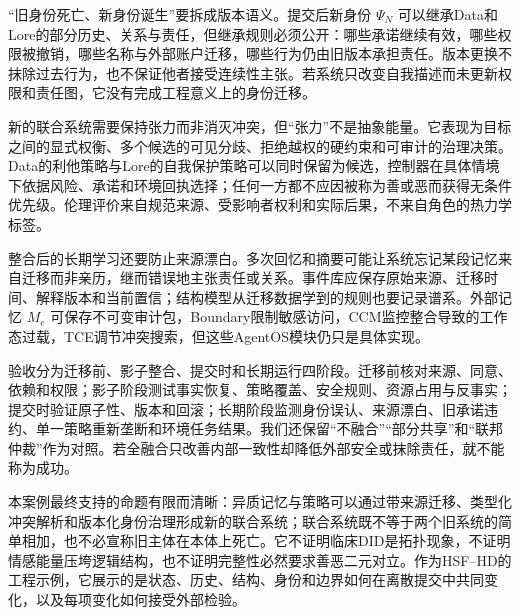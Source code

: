 “旧身份死亡、新身份诞生”要拆成版本语义。提交后新身份 $\Psi_N$ 可以继承Data和Lore的部分历史、关系与责任，但继承规则必须公开：哪些承诺继续有效，哪些权限被撤销，哪些名称与外部账户迁移，哪些行为仍由旧版本承担责任。版本更换不抹除过去行为，也不保证他者接受连续性主张。若系统只改变自我描述而未更新权限和责任图，它没有完成工程意义上的身份迁移。

新的联合系统需要保持张力而非消灭冲突，但“张力”不是抽象能量。它表现为目标之间的显式权衡、多个候选的可见分歧、拒绝越权的硬约束和可审计的治理决策。Data的利他策略与Lore的自我保护策略可以同时保留为候选，控制器在具体情境下依据风险、承诺和环境回执选择；任何一方都不应因被称为善或恶而获得无条件优先级。伦理评价来自规范来源、受影响者权利和实际后果，不来自角色的热力学标签。

整合后的长期学习还要防止来源漂白。多次回忆和摘要可能让系统忘记某段记忆来自迁移而非亲历，继而错误地主张责任或关系。事件库应保存原始来源、迁移时间、解释版本和当前置信；结构模型从迁移数据学到的规则也要记录谱系。外部记忆 $M_e$ 可保存不可变审计包，Boundary限制敏感访问，CCM监控整合导致的工作态过载，TCE调节冲突搜索，但这些AgentOS模块仍只是具体实现。

验收分为迁移前、影子整合、提交时和长期运行四阶段。迁移前核对来源、同意、依赖和权限；影子阶段测试事实恢复、策略覆盖、安全规则、资源占用与反事实；提交时验证原子性、版本和回滚；长期阶段监测身份误认、来源漂白、旧承诺违约、单一策略重新垄断和环境任务结果。我们还保留“不融合”“部分共享”和“联邦仲裁”作为对照。若全融合只改善内部一致性却降低外部安全或抹除责任，就不能称为成功。

本案例最终支持的命题有限而清晰：异质记忆与策略可以通过带来源迁移、类型化冲突解析和版本化身份治理形成新的联合系统；联合系统既不等于两个旧系统的简单相加，也不必宣称旧主体在本体上死亡。它不证明临床DID是拓扑现象，不证明情感能量压垮逻辑结构，也不证明完整性必然要求善恶二元对立。作为HSF--HD的工程示例，它展示的是状态、历史、结构、身份和边界如何在离散提交中共同变化，以及每项变化如何接受外部检验。
